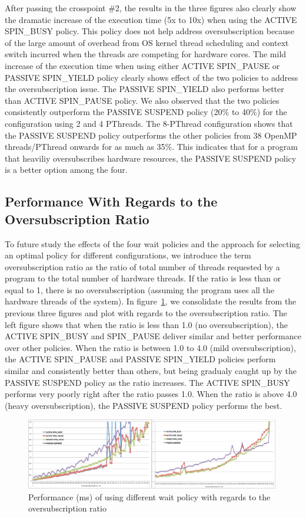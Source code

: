 After passing the crosspoint \#2, the results in the three figures also clearly show the dramatic increase 
of the execution time (5x to 10x) when using the {\sf ACTIVE SPIN\_BUSY} policy. 
This policy does not help address oversubscription because of the large amount of overhead from OS kernel thread scheduling and context switch 
incurred when the threads are competing for hardware cores. The mild increase
of the execution time when using either {\sf ACTIVE SPIN\_PAUSE} or {\sf PASSIVE SPIN\_YIELD} 
policy clearly shows effect of the two policies to address
the oversubscription issue. The {\sf PASSIVE SPIN\_YIELD} also performs better than {\sf ACTIVE SPIN\_PAUSE} policy. 
We also observed that the two policies consistently outperform the {\sf PASSIVE SUSPEND}
policy (20\% to 40\%) for the configuration using 2 and 4 PThreads. The 8-PThread configuration shows that the 
 {\sf PASSIVE SUSPEND} policy outperforms the other policies from 38 OpenMP threads/PThread onwards for as much as 35\%. 
 This indicates that for a program that heaviliy oversubscribes hardware resources, the {\sf PASSIVE SUSPEND} 
 policy is a better option among the four.

\subsection{Performance With Regards to the Oversubscription Ratio}
To future study the effects of the four wait policies and the approach for selecting an optimal policy for different
configurations, we introduce the term oversubscription ratio as the ratio of total number of
threads requested by a program to the total number of hardware threads. If the ratio is less than or equal to 1,
there is no oversubscription (assuming the program uses all the hardware threads of the system). 
In figure~\ref{fig:ovratio}, we consolidate the results from the previous three figures and plot with regards to 
the oversubscription ratio. The left figure shows that when the ratio is less than 1.0 (no oversubscription), 
the {\sf ACTIVE} {\sf SPIN\_BUSY} and {\sf SPIN\_PAUSE} 
deliver similar and better performance over other policies. 
When the ratio is between 1.0 to 4.0 (mild oversubscription), the {\sf ACTIVE SPIN\_PAUSE} and {\sf PASSIVE SPIN\_YIELD} policies 
perform similar and consistently better than others, but being gradualy caught up by the {\sf PASSIVE SUSPEND} policy as the ratio increases. 
The {\sf ACTIVE SPIN\_BUSY} performs very poorly right after the ratio passes 1.0. 
When the ratio is above 4.0 (heavy oversubscription), the {\sf PASSIVE SUSPEND} policy performs the best. 
\begin{figure}[h]
    \includegraphics[width=0.99\textwidth] {images/ovratio}
    \caption{Performance (ms) of using different wait policy with regards to the oversubscription ratio}
    \label{fig:ovratio}
\end{figure}

